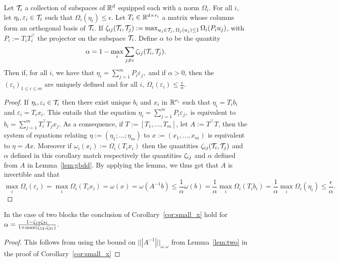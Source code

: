 \documentclass{article}
\begin{document}
\begin{cor}
\label{cor:small_x}
Let $\mathcal{T}_i$ a collection of subspaces of $\mathbb{R}^d$ equipped each with a norm $\Omega_i$. For all $i$, let $\eta_i,\varepsilon_i \in \mathcal{T}_i$ such that
$\Omega_i(\eta_i) \leq \epsilon$. Let $T_i \in \mathbb{R}^{d \times r_i}$ a matrix whose columns form an orthogonal basis of $\mathcal{T}_i$.  If $\zeta_{ij}(\mathcal{T}_i,\mathcal{T}_j):=\max_{u_j \in \mathcal{T}_j,\: \Omega_j(u_j) \leq 1} \Omega_i(P_i u_j)$, with $P_i:=T_iT_i^\top$ the projector on the subspace $\mathcal{T}_i$. Define $\alpha$ to be the quantity
$$\alpha=1-\max_{i} \sum_{j\neq i} \zeta_{ij}(\mathcal{T}_i,\mathcal{T}_j).$$
Then if, for all $i$, we have that 
$\eta_i=\sum_{j=1}^m P_i\varepsilon_j,$
 and if $\alpha>0$, then the $(\varepsilon_i)_{1 \leq i \leq m}$ are uniquely defined and for all $i,\: \Omega_i(\varepsilon_i) \leq \frac{\epsilon}{\alpha}$.
\end{cor}
\begin{proof}
If $\eta_i, \varepsilon_i \in \mathcal{T}_i$ then there exist unique $b_i$ and $x_i$ in $\mathbb{R}^{r_i}$ such that $\eta_i=T_i b_i$ and $\varepsilon_i=T_i x_i$.
This entails that the equation $\eta_i=\sum_{j=1}^m P_i\varepsilon_j,$ is equivalent to $b_i=\sum_{j=1}^m T_i^\top T_j x_j$. As a consequence,
if $T:=[T_1,\ldots,T_m]$, let $A:=T^\top T$, then the system of equations relating $\eta:=(\eta_1;\ldots;\eta_m)$ to $x:=(x_1,\ldots,x_m)$ is equivalent to $\eta=A x$.
Moreover if $\omega_i(x_i):=\Omega_i(T_i x_i)$ then the quantities $\zeta_{ij}(\mathcal{T}_i,\mathcal{T}_j)$ and $\alpha$ defined in this corollary match respectively the quantities $\zeta_{ij}$ and $\alpha$ defined from $A$ in Lemma~\ref{lem:gbdd}. By applying the lemma, we thus get that $A$ is invertible and that
$$\max_i\Omega_i(\varepsilon_i)=\max_i \Omega_i(T_i x_i)=\omega(x)=\omega(A^{-1}b)\leq \frac{1}{\alpha} \omega(b)= \frac{1}{\alpha} \max_{i} \Omega_i(T_i b_i)= \frac{1}{\alpha}\max_i\Omega_i(\eta_i) \leq  \frac{\epsilon}{\alpha}.$$
\end{proof}

\begin{cor}
\label{cor:small_x_two}
In the case of two blocks the conclusion of Corollary~\ref{cor:small_x} hold for $\alpha=\frac{1-\zeta_{12}\zeta_{21}}{1+\max(\zeta_{12},\zeta_{21})}$.
\end{cor}
\begin{proof}
This follows from using the bound on $|||A^{-1}|||_{\omega,\omega}$ from Lemma~\ref{lem:two} in the proof of Corollary~\ref{cor:small_x}
\end{proof}
\end{document}
